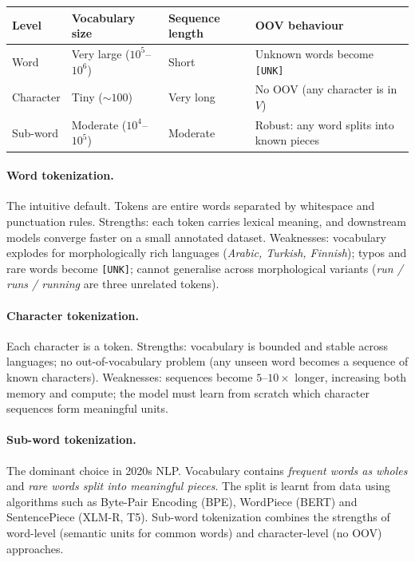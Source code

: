 \documentclass[12pt,a4paper]{report}
\theoremstyle{definition}
\theoremstyle{remark}
\begin{document}
\begin{center}
\begin{tabular}{|l|l|l|l|}
\hline
\textbf{Level} & \textbf{Vocabulary size} & \textbf{Sequence length} & \textbf{OOV behaviour} \\
\hline
Word & Very large ($10^5$--$10^6$) & Short & Unknown words become \texttt{[UNK]} \\
Character & Tiny ($\sim 100$) & Very long & No OOV (any character is in $V$) \\
Sub-word & Moderate ($10^4$--$10^5$) & Moderate & Robust: any word splits into known pieces \\
\hline
\end{tabular}
\end{center}

\paragraph{Word tokenization.}
The intuitive default. Tokens are entire words separated by whitespace and punctuation rules. Strengths: each token carries lexical meaning, and downstream models converge faster on a small annotated dataset. Weaknesses: vocabulary explodes for morphologically rich languages (\emph{Arabic, Turkish, Finnish}); typos and rare words become \texttt{[UNK]}; cannot generalise across morphological variants (\emph{run / runs / running} are three unrelated tokens).

\paragraph{Character tokenization.}
Each character is a token. Strengths: vocabulary is bounded and stable across languages; no out-of-vocabulary problem (any unseen word becomes a sequence of known characters). Weaknesses: sequences become $5$--$10\times$ longer, increasing both memory and compute; the model must learn from scratch which character sequences form meaningful units.

\paragraph{Sub-word tokenization.}
The dominant choice in 2020s NLP. Vocabulary contains \emph{frequent words as wholes} and \emph{rare words split into meaningful pieces}. The split is learnt from data using algorithms such as Byte-Pair Encoding (BPE), WordPiece (BERT) and SentencePiece (XLM-R, T5). Sub-word tokenization combines the strengths of word-level (semantic units for common words) and character-level (no OOV) approaches.
\end{document}
